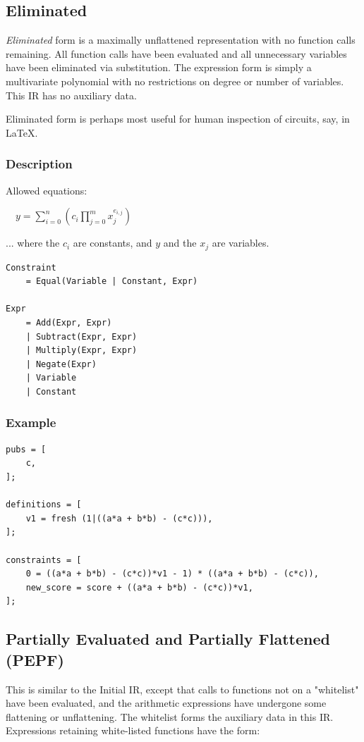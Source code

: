 \documentclass[
    9pt,            %
    techreport,        %
    affiltop,       %
]{art}
\begin{document}
\subsection{Eliminated}
\emph{Eliminated} form is a maximally unflattened representation with no function calls remaining. All function calls have been evaluated and all unnecessary variables have been eliminated via substitution. The expression form is simply a multivariate polynomial with no restrictions on degree or number of variables. This IR has no auxiliary data. 

Eliminated form is perhaps most useful for human inspection of circuits, say, in LaTeX.

\subsubsection{Description}

Allowed equations:
  
  $\displaystyle \quad y = \sum_{i=0}^n\left(c_i\prod_{j=0}^m x_j^{e_{i,j}}\right)$
  
  ... where the $c_i$ are constants, and $y$ and the $x_j$ are variables.

\begin{verbatim}
Constraint
    = Equal(Variable | Constant, Expr)

Expr 
    = Add(Expr, Expr) 
    | Subtract(Expr, Expr)
    | Multiply(Expr, Expr)
    | Negate(Expr)
    | Variable
    | Constant
\end{verbatim}

\subsubsection{Example}

\begin{verbatim}
pubs = [
    c,
];

definitions = [
    v1 = fresh (1|((a*a + b*b) - (c*c))),
];

constraints = [
    0 = ((a*a + b*b) - (c*c))*v1 - 1) * ((a*a + b*b) - (c*c)),
    new_score = score + ((a*a + b*b) - (c*c))*v1,
];
\end{verbatim}

\subsection{Partially Evaluated and Partially Flattened (PEPF)}

This is similar to the Initial IR, except that calls to functions not on a "whitelist" have been evaluated, and the arithmetic expressions have undergone some flattening or unflattening. The whitelist forms the auxiliary data in this IR. Expressions retaining white-listed functions have the form:
\end{document}
